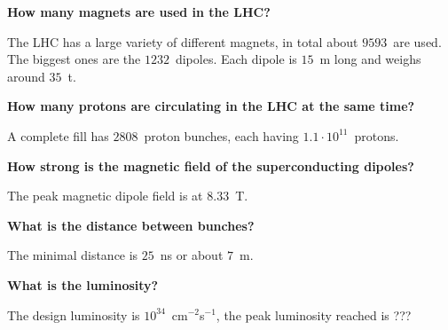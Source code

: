 \documentclass{atlasnote}
\newenvironment{question} %
{\noindent\bfseries}
{\par}
\newenvironment{answer} %
{}
{\vspace*{10pt}}
\newenvironment{faq} %
{\par\noindent\begin{minipage}{\linewidth}}
    {\end{minipage}\par}
\begin{document}
\begin{faq}
    \begin{question}
        How many magnets are used in the LHC?
    \end{question}
    \begin{answer}
        The LHC has a large variety of different magnets, in total about $9593$~are used. The biggest ones are the $1232$~dipoles. Each dipole is $15$~m long and
        weighs around $35$~t.
    \end{answer}
\end{faq}

\begin{faq}
    \begin{question}
        How many protons are circulating in the LHC at the same time?
    \end{question}
    \begin{answer}
        A complete fill has $2808$~proton bunches, each having $1.1 \cdot 10^{11}$~protons.
    \end{answer}
\end{faq}

\begin{faq}
    \begin{question}
        How strong is the magnetic field of the superconducting dipoles?
    \end{question}
    \begin{answer}
        The peak magnetic dipole field is at $8.33$~T.
    \end{answer}
\end{faq}

\begin{faq}
    \begin{question}
        What is the distance between bunches?
    \end{question}
    \begin{answer}
        The minimal distance is $25$~ns or about $7$~m.
    \end{answer}
\end{faq}

\begin{faq}
    \begin{question}
        What is the luminosity?
    \end{question}
    \begin{answer}
        The design luminosity is $10^{34}$~cm$^{-2}$s$^{-1}$, the peak luminosity reached is ???
    \end{answer}
\end{faq}
\end{document}
